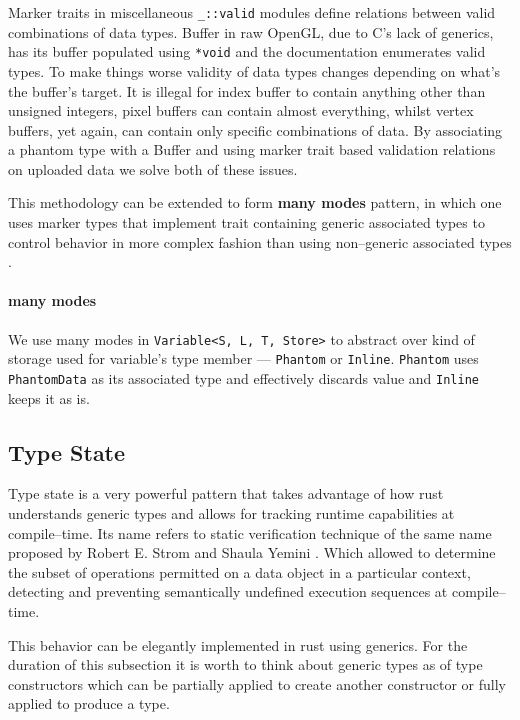 Marker traits in miscellaneous \texttt{\_::valid} modules define relations between valid combinations of data types. Buffer in raw OpenGL, 
due to C's lack of generics, has its buffer populated using \texttt{*void} and the documentation enumerates valid types. 
To make things worse validity of data types changes depending on what's the buffer's target.
It is illegal for index buffer to contain anything other than unsigned integers, pixel buffers can contain almost everything, whilst vertex buffers, 
yet again, can contain only specific combinations of data.
By associating a phantom type with a Buffer and using marker trait based validation relations on uploaded data we solve both of these issues.

This methodology can be extended to form \textbf{many modes} pattern, in which one uses marker types that implement trait 
containing generic associated types to control behavior in more complex fashion than using non--generic associated types \cite{nikobloggats}.

\paragraph{many modes}

We use many modes in \texttt{Variable<S, L, T, Store>} to abstract over kind of storage used for variable's type member --- \texttt{Phantom} or \texttt{Inline}.
\texttt{Phantom} uses \texttt{PhantomData} as its associated type and effectively discards value and \texttt{Inline} keeps it as is.

\subsection{Type State}

Type state is a very powerful pattern that takes advantage of how rust understands generic types and allows for tracking runtime capabilities at compile--time.
Its name refers to static verification technique of the same name proposed by Robert E. Strom and Shaula Yemini \cite{typestate}. 
Which allowed to determine the subset of operations permitted on a data object in a particular context,
detecting and preventing semantically undefined execution sequences at compile--time.

This behavior can be elegantly implemented in rust using generics.
For the duration of this subsection it is worth to think about generic types as of type constructors which can be partially applied to create another constructor or fully applied to produce a type.

